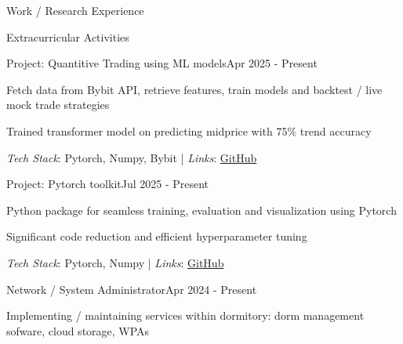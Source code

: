 \documentclass{kyvernitis-resume}
\begin{document}
\begin{section}{Work / Research Experience}
    

  
\end{section}
\begin{section}{Extracurricular Activities}
     
    \begin{subsectionnosl}{Project: Quantitive Trading using ML models}{Apr 2025 - Present}
     \item{Fetch data from Bybit API, retrieve features, train models and backtest / live mock trade strategies}
     \item{Trained transformer model on predicting midprice with 75\% trend accuracy}
     \end{subsectionnosl}
    \textit{Tech Stack}: Pytorch, Numpy, Bybit\hspace{0.1cm} | \hspace{0.1cm}
    \textit{Links}: \href{https://github.com/noahpy/my_ml_crypto_trading}{GitHub}

    \begin{subsectionnosl}{Project: Pytorch toolkit}{Jul 2025 - Present}
     \item{Python package for seamless training, evaluation and visualization using Pytorch}
     \item{Significant code reduction and efficient hyperparameter tuning}
     \end{subsectionnosl}
    \textit{Tech Stack}: Pytorch, Numpy \hspace{0.1cm} | \hspace{0.1cm}
    \textit{Links}: \href{https://github.com/noahpy/my_pytorch_kit}{GitHub}

     \begin{subsectionnosl}{Network / System Administrator}{Apr 2024 - Present}
     \item{Implementing / maintaining services within dormitory: dorm management sofware, cloud storage, WPAs}
     \end{subsectionnosl}
    



\end{section}
\end{document}

